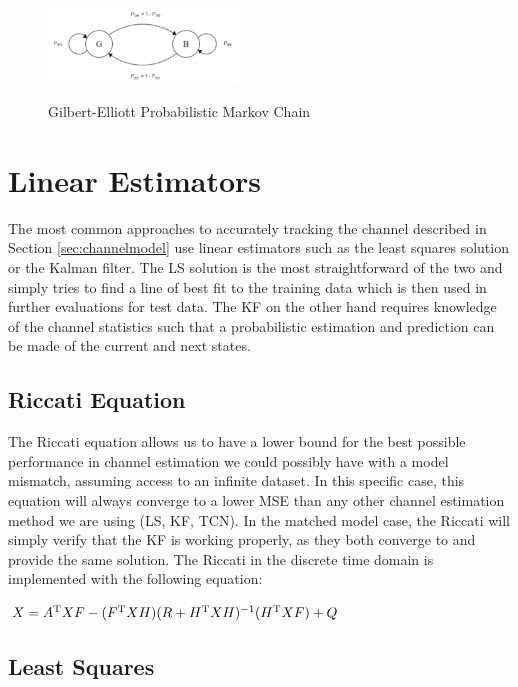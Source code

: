 \documentclass[twocolumn,letterpaper]{IEEEAerospaceCLS}  %
\begin{document}
\begin{figure}[!h]
\centering\includegraphics[width=0.45\textwidth]{figs/GBmodel.PNG}\\
\caption{Gilbert-Elliott Probabilistic Markov Chain}
\label{gbe}
\end{figure}

\section{Linear Estimators}
\label{sec:linest}

The most common approaches to accurately tracking the channel described in Section \ref{sec:channelmodel} use linear estimators such as the least squares solution or the Kalman filter. The LS solution is the most straightforward of the two and simply tries to find a line of best fit to the training data which is then used in further evaluations for test data. The KF on the other hand requires knowledge of the channel statistics such that a probabilistic estimation and prediction can be made of the current and next states. 

\subsection{Riccati Equation}

The Riccati equation allows us to have a lower bound for the best possible performance in channel estimation we could possibly have with a model mismatch, assuming access to an infinite dataset. In this specific case, this equation will always converge to a lower MSE than any other channel estimation method we are using (LS, KF, TCN). In the matched model case, the Riccati will simply verify that the KF is working properly, as they both converge to and provide the same solution. The Riccati in the discrete time domain is implemented with the following equation: 

$X=A^{\rm T}XF-(F^{\rm T}XH)(R+H^{\rm T}XH)^{-1}(H^{\rm T}XF) + Q $

\subsection{Least Squares}
\end{document}
